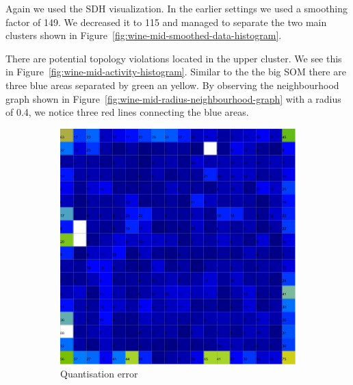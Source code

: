 \documentclass{acm_proc_article-sp}
\begin{document}
Again we used the SDH visualization. In the earlier settings we used a smoothing factor of 149. We decreased it to
115 and managed to separate the two main clusters shown in Figure~\ref{fig:wine-mid-smoothed-data-histogram}.

There are potential topology violations located in the upper cluster. We see this in Figure~\ref{fig:wine-mid-activity-histogram}.
Similar to the the big SOM there are three blue areas separated by green an yellow.
By observing the neighbourhood graph shown in Figure~\ref{fig:wine-mid-radius-neighbourhood-graph} with a radius of 0.4, we notice three red lines connecting the blue areas.


\begin{figure}
\centering
\begin{subfigure}[b]{0.45\linewidth}
    \includegraphics[width=\linewidth]{img/wine-mid-quant-error}
    \caption{Quantisation error}
    \label{fig:wine-mid-quant-error}
\end{subfigure}
\begin{subfigure}[b]{0.45\linewidth}

\end{subfigure}
\end{figure}
\end{document}
